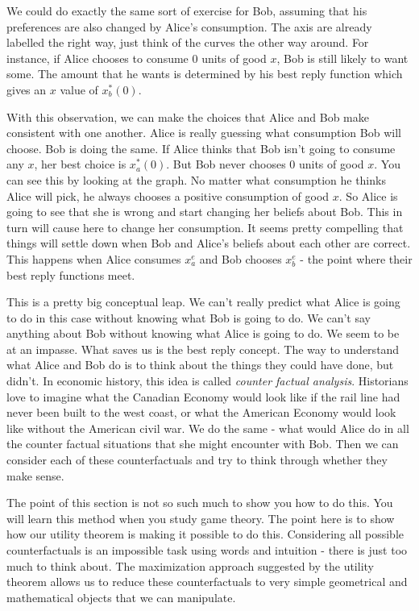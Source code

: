 \documentclass[12pt]{article}
\newcommand{\tmem}[1]{{\em #1\/}}
\begin{document}
We could do exactly the same sort of exercise for Bob, assuming that his
preferences are also changed by Alice's consumption. The axis are already
labelled the right way, just think of the curves the other way around. For
instance, if Alice chooses to consume 0 units of good $x$, Bob is still likely
to want some. The amount that he wants is determined by his best reply
function which gives an $x$ value of $x^{\ast}_b ( 0 )$.

With this observation, we can make the choices that Alice and Bob make
consistent with one another. Alice is really guessing what consumption Bob
will choose. Bob is doing the same. If Alice thinks that Bob isn't going to
consume any $x$, her best choice is $x^{\ast}_a ( 0 )$. But Bob never chooses
0 units of good $x$. You can see this by looking at the graph. No matter what
consumption he thinks Alice will pick, he always chooses a positive
consumption of good $x$. So Alice is going to see that she is wrong and start
changing her beliefs about Bob. This in turn will cause here to change her
consumption. It seems pretty compelling that things will settle down when Bob
and Alice's beliefs about each other are correct. This happens when Alice
consumes $x^e_a$ and Bob chooses $x^e_b$ - the point where their best reply
functions meet.

This is a pretty big conceptual leap. We can't really predict what Alice is
going to do in this case without knowing what Bob is going to do. We can't say
anything about Bob without knowing what Alice is going to do. We seem to be at
an impasse. What saves us is the best reply concept. The way to understand
what Alice and Bob do is to think about the things they could have done, but
didn't. In economic history, this idea is called {\tmem{counter factual
analysis}}. Historians love to imagine what the Canadian Economy would look
like if the rail line had never been built to the west coast, or what the
American Economy would look like without the American civil war. We do the
same - what would Alice do in all the counter factual situations that she
might encounter with Bob. Then we can consider each of these counterfactuals
and try to think through whether they make sense.

The point of this section is not so such much to show you how to do this. You will
learn this method when you study game theory. The point here is to show how
our utility theorem is making it possible to do this. Considering all possible
counterfactuals is an impossible task using words and intuition - there is
just too much to think about. The maximization approach suggested by the
utility theorem allows us to reduce these counterfactuals to very simple
geometrical and mathematical objects that we can manipulate.
\end{document}
